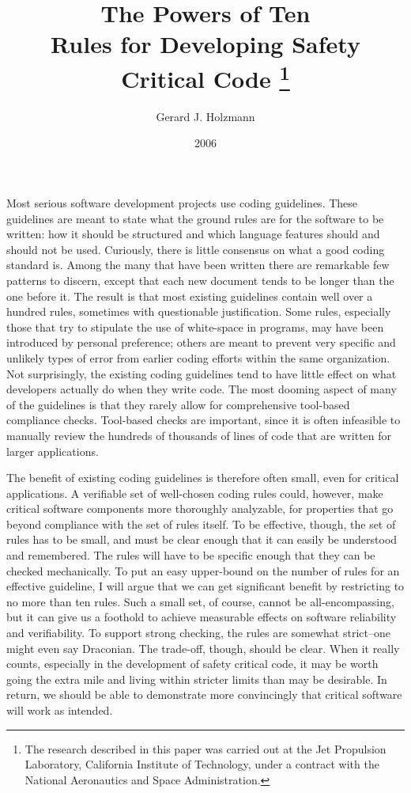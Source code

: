 \documentclass[11pt,oneside]{article}
\title{The Powers of Ten \\
Rules for Developing Safety Critical Code \footnote{%
The research described in this paper was carried out at the Jet Propulsion
Laboratory, California Institute of Technology, under a contract with the
National Aeronautics and Space Administration.}}
\author{Gerard J. Holzmann}
\date{2006}
\begin{document}
\maketitle
\tableofcontents
\newpage
Most serious software development projects use coding guidelines. These
guidelines are meant to state what the ground rules are for the software to be
written: how it should be structured and which language features should and
should not be used. Curiously, there is little consensus on what a good coding
standard is. Among the many that have been written there are remarkable few
patterns to discern, except that each new document tends to be longer than
the one before it. The result is that most existing guidelines contain well
over a hundred rules, sometimes with questionable justification. Some rules,
especially those that try to stipulate the use of white-space in programs, may
have been introduced by personal preference; others are meant to prevent very
specific and unlikely types of error from earlier coding efforts within the
same organization. Not surprisingly, the existing coding guidelines tend to
have little effect on what developers actually do when they write code. The
most dooming aspect of many of the guidelines is that they rarely allow for
comprehensive tool-based compliance checks. Tool-based checks are important,
since it is often infeasible to manually review the hundreds of thousands of
lines of code that are written for larger applications.

The benefit of existing coding guidelines is therefore often small, even for
critical applications. A verifiable set of well-chosen coding rules could,
however, make critical software components more thoroughly analyzable, for
properties that go beyond compliance with the set of rules itself. To be
effective, though, the set of rules has to be small, and must be clear enough
that it can easily be understood and remembered. The rules will have to be
specific enough that they can be checked mechanically. To put an easy
upper-bound on the number of rules for an effective guideline, I will argue
that we can get significant benefit by restricting to no more than ten rules.
Such a small set, of course, cannot be all-encompassing, but it can give us a
foothold to achieve measurable effects on software reliability and
verifiability. To support strong checking, the rules are somewhat strict--one
might even say Draconian. The trade-off, though, should be clear. When it
really counts, especially in the development of safety critical code, it may be
worth going the extra mile and living within stricter limits than may be
desirable. In return, we should be able to demonstrate more convincingly that
critical software will work as intended.
\end{document}
